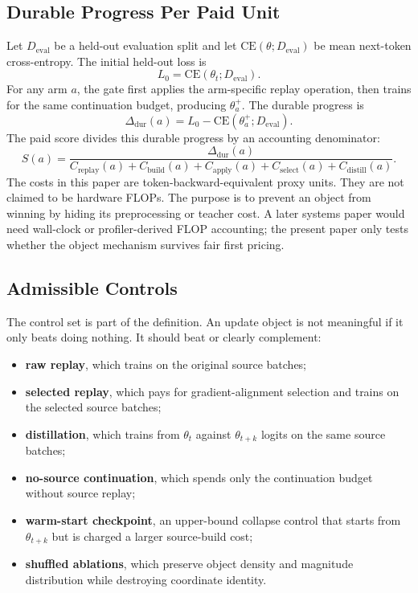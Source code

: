 \documentclass{article}
\begin{document}
\subsection{Durable Progress Per Paid Unit}

Let $D_{\mathrm{eval}}$ be a held-out evaluation split and let
$\mathrm{CE}(\theta;D_{\mathrm{eval}})$ be mean next-token cross-entropy. The
initial held-out loss is
\begin{equation}
  L_0 = \mathrm{CE}(\theta_t;D_{\mathrm{eval}}).
\end{equation}
For any arm $a$, the gate first applies the arm-specific replay operation,
then trains for the same continuation budget, producing $\theta_a^{+}$. The
durable progress is
\begin{equation}
  \Delta_{\mathrm{dur}}(a) =
  L_0 - \mathrm{CE}(\theta_a^{+};D_{\mathrm{eval}}).
\end{equation}
The paid score divides this durable progress by an accounting denominator:
\begin{equation}
  S(a) = \frac{\Delta_{\mathrm{dur}}(a)}
  {C_{\mathrm{replay}}(a)+C_{\mathrm{build}}(a)+C_{\mathrm{apply}}(a)
  +C_{\mathrm{select}}(a)+C_{\mathrm{distill}}(a)}.
  \label{eq:paid_score}
\end{equation}
The costs in this paper are token-backward-equivalent proxy units. They are not
claimed to be hardware FLOPs. The purpose is to prevent an object from winning
by hiding its preprocessing or teacher cost. A later systems paper would need
wall-clock or profiler-derived FLOP accounting; the present paper only tests
whether the object mechanism survives fair first pricing.

\subsection{Admissible Controls}

The control set is part of the definition. An update object is not meaningful
if it only beats doing nothing. It should beat or clearly complement:
\begin{itemize}
  \item \textbf{raw replay}, which trains on the original source batches;
  \item \textbf{selected replay}, which pays for gradient-alignment selection
  and trains on the selected source batches;
  \item \textbf{distillation}, which trains from $\theta_t$ against
  $\theta_{t+k}$ logits on the same source batches;
  \item \textbf{no-source continuation}, which spends only the continuation
  budget without source replay;
  \item \textbf{warm-start checkpoint}, an upper-bound collapse control that
  starts from $\theta_{t+k}$ but is charged a larger source-build cost;
  \item \textbf{shuffled ablations}, which preserve object density and
  magnitude distribution while destroying coordinate identity.
\end{itemize}
\end{document}
